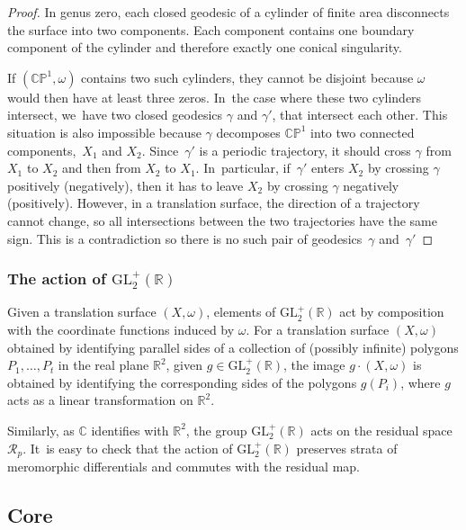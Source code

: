 \begin{proof}
In genus zero, each closed geodesic of a cylinder of finite area disconnects the surface into two components. Each component contains one boundary component of the cylinder and therefore exactly one conical singularity.

If $(\mathbb{CP}^{1},\omega)$ contains two such cylinders, they cannot be disjoint because $\omega$ would then have at least three zeros. In~the case where these two cylinders intersect, we~have two closed geodesics $\gamma$ and $\gamma'$, that intersect each other. This situation is also impossible because $\gamma$ decomposes $\mathbb{CP}^{1}$ into two connected components,~$X_{1}$ and $X_{2}$. Since~$\gamma'$ is a periodic trajectory, it should cross $\gamma$ from $X_{1}$ to $X_{2}$ and then from $X_{2}$ to $X_{1}$. In~particular, if~$\gamma'$ enters $X_{2}$ by crossing $\gamma$ positively (\resp negatively), then it has to leave $X_{2}$ by crossing $\gamma$ negatively (positively). However, in a translation surface, the direction of a trajectory cannot change, so all intersections between the two trajectories have the same sign. This is a contradiction so there is no such pair of geodesics~$\gamma$ and~$\gamma'$
\end{proof}

\subsubsection{The action of $\mathrm{GL}_{2}^{+}(\mathbb{R})$}\label{subsub:action}

Given a translation surface $(X,\omega)$, elements of $\mathrm{GL}_{2}^{+}(\mathbb{R})$ act by composition with the coordinate functions induced by $\omega$. For a translation surface $(X,\omega)$ obtained by identifying parallel sides of a collection of (possibly infinite) polygons $P_{1},\dots,P_{t}$ in the real plane $\mathbb{R}^{2}$, given $g\in \mathrm{GL}_{2}^{+}(\mathbb{R})$, the image $g\cdot(X,\omega)$ is obtained by identifying the corresponding sides of the polygons $g(P_i)$, where $g$ acts as a linear transformation on $\mathbb{R}^{2}$.

Similarly, as $\mathbb{C}$ identifies with $\mathbb{R}^{2}$, the group $\mathrm{GL}_{2}^{+}(\mathbb{R})$ acts on the residual space~$\mathcal{R}_p$. It~is easy to check that the action of $\mathrm{GL}_{2}^{+}(\mathbb{R})$ preserves strata of meromorphic differentials and commutes with the residual map.

\subsection{Core}\label{sub:core}

